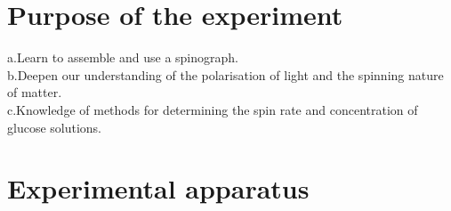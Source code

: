 \documentclass[UTF8]{article}
\begin{document}
	
	\section{Purpose of the experiment}

       a.Learn to assemble and use a spinograph.\\
     b.Deepen our understanding of the polarisation of light and the spinning nature of matter.\\
       c.Knowledge of methods for determining the spin rate and concentration of glucose solutions.
	
	

	
	
	\section{Experimental apparatus}
	
\end{document}
